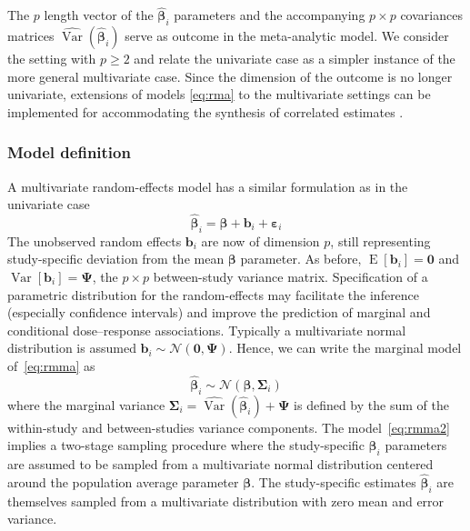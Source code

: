\documentclass[11pt,a4paper,twoside,openany]{book}\usepackage{knitr}
\DeclareMathOperator{\Var}{Var}
\DeclareMathOperator{\E}{E}
\begin{document}
{{\noindent The $p$ length vector of the $\boldsymbol{\hat \beta}_i$ parameters and the accompanying $p \times p$ covariances matrices $\widehat{\Var} \left( \boldsymbol{\hat \beta}_i \right)$ serve as outcome in the meta-analytic model. We consider the setting with $p \ge 2$ and relate the univariate case as a simpler instance of the more general multivariate case. Since the dimension of the outcome is no longer univariate, extensions of models \ref{eq:rma} to the multivariate settings can be implemented for accommodating the synthesis of correlated estimates \citep{berkey1998meta, gasparrini2012multivariate, ritz2008multivariate}.

\subsubsection*{Model definition}

A multivariate random-effects model has a similar formulation as in the univariate case
\begin{equation}
\boldsymbol{\hat \beta}_i = \boldsymbol{\beta} + \mathbf{b}_i + \boldsymbol{\varepsilon}_i
\label{eq:rmma}
\end{equation}
\noindent The unobserved random effects $\mathbf{b}_i$ are now of dimension $p$, still representing study-specific deviation from the mean $\boldsymbol{\beta}$ parameter. As before, $\E\left[\mathbf{b}_i\right] = \mathbf{0}$ and $\Var\left[\mathbf{b}_i\right] = \boldsymbol{\Psi}$, the $p \times p$ between-study variance matrix. Specification of a parametric distribution for the random-effects may facilitate the inference (especially confidence intervals) and improve the prediction of marginal and conditional dose--response associations. Typically a multivariate normal distribution is assumed $\mathbf{b}_i \sim \mathcal{N}\left(\mathbf{0}, \boldsymbol{\Psi} \right)$. Hence, we can write the marginal model of~\ref{eq:rmma} as
\begin{equation}
\boldsymbol{\hat \beta}_i \sim \mathcal{N}\left(\boldsymbol{\beta}, \boldsymbol{\Sigma}_i \right)
\label{eq:rmma2}
\end{equation}
\noindent where the marginal variance $\boldsymbol{\Sigma}_i = \widehat{\Var} \left( \boldsymbol{\hat \beta}_i \right) + \boldsymbol{\Psi}$ is defined by the sum of the within-study and between-studies variance components. The model~\ref{eq:rmma2} implies a two-stage sampling procedure where the study-specific $\boldsymbol{\beta}_i$ parameters are assumed to be sampled from a multivariate normal distribution centered around the population average parameter $\boldsymbol{\beta}$. The study-specific estimates $\boldsymbol{\hat \beta}_i$ are themselves sampled from a multivariate distribution with zero mean and error variance.

}}
\end{document}
